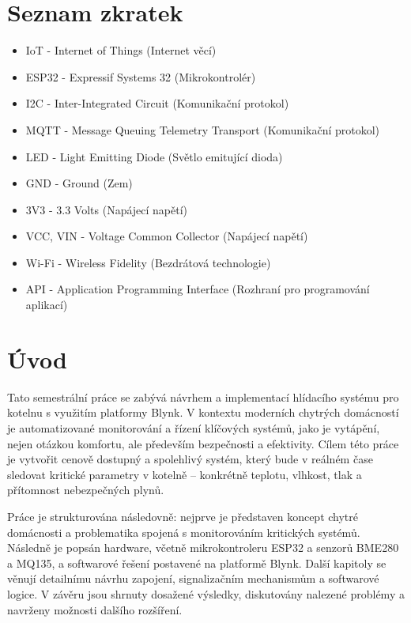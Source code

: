 \documentclass[12pt, twoside]{article} %
\begin{document}



\newpage
\tableofcontents
\newpage

\section*{Seznam zkratek}
\begin{itemize}
    \item IoT - Internet of Things (Internet věcí)
    \item ESP32 - Expressif Systems 32 (Mikrokontrolér)
    \item I2C - Inter-Integrated Circuit (Komunikační protokol)
    \item MQTT - Message Queuing Telemetry Transport (Komunikační protokol)
    \item LED - Light Emitting Diode (Světlo emitující dioda)
    \item GND - Ground (Zem)
    \item 3V3 - 3.3 Volts (Napájecí napětí)
    \item VCC, VIN - Voltage Common Collector (Napájecí napětí)
    \item Wi-Fi - Wireless Fidelity (Bezdrátová technologie)
    \item API - Application Programming Interface (Rozhraní pro programování aplikací)
\end{itemize}
\newpage

\section{Úvod}
Tato semestrální práce se zabývá návrhem a implementací hlídacího systému pro kotelnu s využitím platformy Blynk. V kontextu moderních chytrých domácností je automatizované monitorování a řízení klíčových systémů, jako je vytápění, nejen otázkou komfortu, ale především bezpečnosti a efektivity. Cílem této práce je vytvořit cenově dostupný a spolehlivý systém, který bude v reálném čase sledovat kritické parametry v kotelně – konkrétně teplotu, vlhkost, tlak a přítomnost nebezpečných plynů.

Práce je strukturována následovně: nejprve je představen koncept chytré domácnosti a problematika spojená s monitorováním kritických systémů. Následně je popsán hardware, včetně mikrokontroleru ESP32 a senzorů BME280 a MQ135, a softwarové řešení postavené na platformě Blynk. Další kapitoly se věnují detailnímu návrhu zapojení, signalizačním mechanismům a softwarové logice. V závěru jsou shrnuty dosažené výsledky, diskutovány nalezené problémy a navrženy možnosti dalšího rozšíření.
\end{document}
